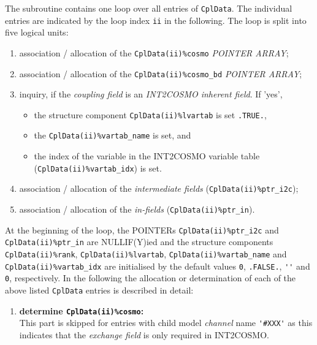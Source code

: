 \documentclass[11pt,twoside]{article}
\begin{document}
\begin{itemize}
The subroutine contains one loop over all entries of \verb|CplData|. The 
individual entries are indicated by the loop index \verb|ii| in the following.
The loop is split into five logical units:
\begin{enumerate}%
\item association / allocation of the \verb|CplData(ii)%cosmo| 
{ \footnotesize \it POINTER ARRAY};
\item association / allocation of the \verb|CplData(ii)%cosmo_bd| 
{ \footnotesize \it POINTER ARRAY};
\item inquiry, if the {\it coupling field} is an {\it INT2COSMO inherent
field}. If 'yes', 
\begin{itemize}%
\item the structure component \verb|CplData(ii)%lvartab| is set \verb|.TRUE.|,
\item the \verb|CplData(ii)%vartab_name| is set, and
\item the index of the variable in the INT2COSMO variable table 
(\verb|CplData(ii)%vartab_idx|) is set.
\end{itemize}%
\item association  / allocation of the {\it intermediate fields}
(\verb|CplData(ii)%ptr_i2c|);
\item association  / allocation of the {\it in-fields} 
(\verb|CplData(ii)%ptr_in|).
\end{enumerate}%

At the beginning of the loop, the {\footnotesize POINTERs} 
\verb|CplData(ii)%ptr_i2c| and 
\verb|CplData(ii)%ptr_in| are NULLIF(Y)ied and the structure components 
\verb|CplData(ii)%rank|, \verb|CplData(ii)%lvartab|,
\verb|CplData(ii)%vartab_name| and  \verb|CplData(ii)%vartab_idx|
 are initialised by the default values \verb|0|, \verb|.FALSE.|, \verb|''| and 
\verb|0|, respectively. 
In the following the allocation or determination of each of the 
above listed \verb|CplData| entries is described in detail:


\begin{enumerate} %
\item {\bf determine {\tt CplData(ii)\%cosmo}:}\\
This part is skipped for entries with child model {\it channel} name \verb|'#XXX'| as 
this indicates that the {\it exchange field} is only required in INT2COSMO.


\end{enumerate}
\end{itemize}
\end{document}
